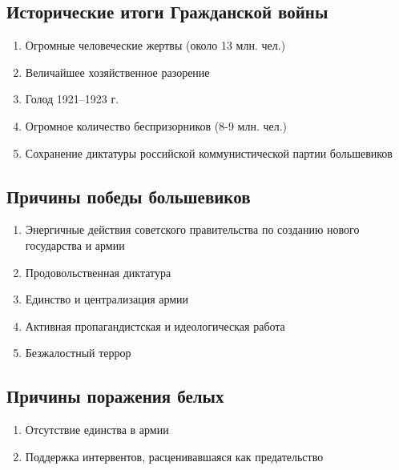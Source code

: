 \subsection{Исторические итоги Гражданской войны}

\begin{enumerate}
    \item Огромные человеческие жертвы (около 13 млн. чел.)
    \item Величайшее хозяйственное разорение
    \item Голод 1921--1923 г.
    \item Огромное количество беспризорников (8-9 млн. чел.) 
    \item Сохранение диктатуры российской коммунистической партии большевиков
\end{enumerate}

\subsection{Причины победы большевиков}

\begin{enumerate}
    \item Энергичные действия советского правительства по созданию нового государства и армии
    \item Продовольственная диктатура
    \item Единство и централизация армии
    \item Активная пропагандистская и идеологическая работа
    \item Безжалостный террор
\end{enumerate}

\subsection{Причины поражения белых}

\begin{enumerate}
    \item Отсутствие единства в армии
    \item Поддержка интервентов, расценивавшаяся как предательство
\end{enumerate}
